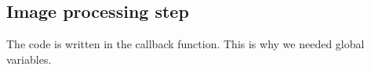 \documentclass[english,a4paper,12pt,oneside]{article}
\begin{document}
%        
%




\subsection{Image processing step}

The code is written in the callback function. 
This is why we needed global variables. 
\end{document}
